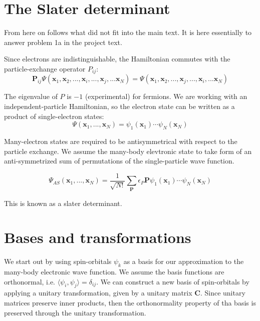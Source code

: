 \documentclass[a4paper,10pt, twocolumn, pre]{revtex4}
\newcommand{\xvec}{\mathbf{x}}
\newcommand{\Pvec}{\mathbf{P}}
\newcommand{\mb}{\mathbf}
\begin{document}




\begin{appendix}

\section{The Slater determinant}
From here on follows what did not fit into the main text. It is here essentially to answer problem 1a in the project text.

Since electrons are indistinguishable, the Hamiltonian commutes with the particle-exchange operator $P_{ij}$:
\begin{equation}
	\Pvec_{ij}\Psi(\xvec_1, \xvec_2, ..., \xvec_i, ..., \xvec_j, ... \xvec_N) = \Psi(\xvec_1, \xvec_2, ..., \xvec_j, ..., \xvec_i, ... \xvec_N)
\end{equation}

The eigenvalue of $P$ is $-1$ (experimental) for fermions. We are working with an independent-particle Hamiltonian, so the electron state can be written as a product of single-electron states:
\begin{equation}
	\Psi(\xvec_1, ..., \xvec_N) = \psi_1(\xvec_1)\cdots\psi_N(\xvec_N)
\end{equation}

Many-electron states are required to be antisymmetrical with respect to the particle exchange. We assume the many-body elevtronic state to take form of an anti-symmetrized sum of permutations of the single-particle wave function. 

\begin{equation}
	\Psi_{AS} (\xvec_1, ..., \xvec_N) = \frac{1}{\sqrt{N!}} \sum_\mb{P} \epsilon_P \mb{P} \psi_1(\xvec_1) \cdots \psi_N(\xvec_N)
\end{equation}

This is known as a slater determinant.

\section{Bases and transformations}
We start out by using spin-orbitals $\psi_k$ as a basis for our approximation to the many-body electronic wave function. We assume the basis functions are orthonormal, i.e. $\langle \psi_i, \psi_j \rangle = \delta_{ij}$. We can construct a new basis of spin-orbitals by applying a unitary transformation, given by a unitary matrix $\mb{C}$. Since unitary matrices preserve inner products, then the orthonormality property of tha basis is preserved through the unitary transformation. 



\end{appendix}
\end{document}
